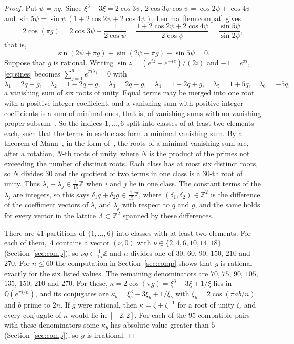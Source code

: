 \documentclass[11pt]{amsart}
\theoremstyle{remark}
\numberwithin{equation}{section}
\newcommand{\Z}{\mathbb{Z}}
\begin{document}
\begin{proof}
Put $\psi=\pi q$. Since $\xi^3-3\xi=2\cos3\psi$,
$2\cos3\psi\cos\psi=\cos2\psi+\cos4\psi$ and
$\sin5\psi=\sin\psi\,(1+2\cos2\psi+2\cos4\psi)$, Lemma~\ref{lem:compat}
gives
\[
2\cos(\pi g)=2\cos3\psi+\frac{1}{2\cos\psi}
=\frac{1+2\cos2\psi+2\cos4\psi}{2\cos\psi}=\frac{\sin5\psi}{\sin2\psi},
\]
that is,
\begin{equation}\label{eq:sines}
\sin(2\psi+\pi g)+\sin(2\psi-\pi g)-\sin5\psi=0.
\end{equation}
Suppose that $g$ is rational. Writing $\sin z=(e^{iz}-e^{-iz})/(2i)$ and
$-1=e^{\pi i}$, \eqref{eq:sines} becomes $\sum_{j=1}^6e^{\pi i\lambda_j}=0$ with
\[
\lambda_1=2q+g,\quad \lambda_2=1-2q-g,\quad \lambda_3=2q-g,\quad \lambda_4=1-2q+g,\quad
\lambda_5=1+5q,\quad \lambda_6=-5q,
\]
a vanishing sum of six roots of unity. Equal terms may be merged into one
root with a positive integer coefficient, and a vanishing sum with
positive integer coefficients is a sum of minimal ones, that is, of
vanishing sums with no vanishing proper subsum~\cite[Section~3]{PR98}.
So the indices $1,\dots,6$ split into classes of at least two elements
each, such that the terms in each class form a minimal vanishing sum.
By a theorem of Mann~\cite{Man65}, in the form
of~\cite[Lemma~1]{PR98}, the roots of a minimal vanishing sum are, after
a rotation, $N$-th roots of unity, where $N$ is the product of the primes
not exceeding the number of distinct roots. Each class has at most six
distinct roots, so $N$ divides $30$ and the quotient of two terms in one
class is a $30$-th root of unity. Thus $\lambda_i-\lambda_j\in\frac1{15}\Z$
when $i$ and $j$ lie in one class. The constant terms of the
$\lambda_j$ are integers, so this says $\delta_1q+\delta_2g\in\frac1{15}\Z$,
where $(\delta_1,\delta_2)\in\Z^2$ is the difference of the coefficient
vectors of $\lambda_i$ and $\lambda_j$ with respect to $q$ and $g$, and
the same holds for every vector in the lattice $\Lambda\subset\Z^2$
spanned by these differences.

There are $41$ partitions of $\{1,\dots,6\}$ into classes with at least
two elements. For each of them, $\Lambda$ contains a vector $(\nu,0)$
with $\nu\in\{2,4,6,10,14,18\}$ (Section~\ref{sec:comp}), so
$\nu q\in\frac1{15}\Z$ and $n$ divides one of $30$, $60$, $90$, $150$, $210$
and $270$. For $n\le60$ the computation in Section~\ref{sec:comp} shows
that $g$ is rational exactly for the six listed values. The remaining
denominators are $70$, $75$, $90$, $105$, $135$, $150$, $210$ and $270$.
For these, $\kappa=2\cos(\pi g)=\xi^3-3\xi+1/\xi$ lies in
$\mathbb Q(e^{\pi i/n})$, and its conjugates are
$\kappa_b=\xi_b^3-3\xi_b+1/\xi_b$ with $\xi_b=2\cos(\pi ab/n)$ and $b$
prime to $2n$. If $g$ were rational, then $\kappa=\zeta+\zeta^{-1}$ for a
root of unity $\zeta$, and every conjugate of $\kappa$ would lie in
$[-2,2]$. For each of the $95$ compatible pairs with these denominators
some $\kappa_b$ has absolute value greater than $5$
(Section~\ref{sec:comp}), so $g$ is irrational.
\end{proof}
\end{document}

